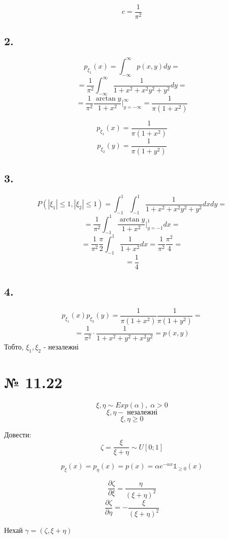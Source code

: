 \documentclass[11pt, a4paper]{article} %
\begin{document}
\begin{mdframed}[style=ans]
    $$c = \frac{1}{\pi^2}$$
\end{mdframed}

\subsection*{2.}
$$p_{\xi_1}(x) = \int_{-\infty}^\infty p(x,y) dy = $$
$$= \frac{1}{\pi^2} \int_{-\infty}^\infty \frac{1}{1+x^2+x^2y^2+y^2} dy = $$
$$= \frac{1}{\pi^2} \frac{\arctan y}{1 + x^2} |_{y = -\infty}^\infty = \frac{1}{\pi(1+x^2)}$$

$$p_{\xi_1}(x) = \frac{1}{\pi(1+x^2)}$$
$$p_{\xi_2}(y) = \frac{1}{\pi(1+y^2)}$$

\subsection*{3.}
$$P(|\xi_1|\le 1, |\xi_2| \le 1) = \int_{-1}^{1} \int_{-1}^1 \frac{1}{1+x^2+x^2y^2+y^2} dxdy = $$
$$ = \frac{1}{\pi^2} \int_{-1}^{1} \frac{\arctan y}{1 + x^2} |_{y=-1}^1 dx = $$ 
$$ = \frac{1}{\pi^2} \frac{\pi}{2} \int_{-1}^{1} \frac{1}{1 + x^2} dx = \frac{1}{\pi^2} \frac{\pi^2}{4} = $$
$$ = \frac{1}{4}$$

\subsection*{4.}
$$p_{\xi_1}(x)p_{\xi_2}(y) = \frac{1}{\pi(1+x^2)}\frac{1}{\pi(1+y^2)} = $$
$$= \frac{1}{\pi^2} \cdot \frac{1}{1 + x^2 + y^2 + x^2y^2} = p(x,y)$$
Тобто, $\xi_1, \xi_2$ - незалежні \qedsymbol

\section*{№ 11.22}
\begin{mdframed}
    $$\xi,\eta \sim Exp(\alpha), \; \alpha >0$$
    $$\xi, \eta - \;\text{незалежні}$$
    $$\boxed{\xi, \eta \ge 0}$$

    Довести:
    $$\zeta = \frac{\xi}{\xi+\eta} \sim U[0;1]$$
\end{mdframed}

$$p_\xi(x) = p_\eta(x) = p(x) = \alpha e^{-\alpha x} \mathbb{1}_{\ge 0}(x)$$

$$\frac{\partial \zeta}{\partial \xi} = \frac{\eta}{(\xi+\eta)^2}$$
$$\frac{\partial \zeta}{\partial \eta} = -\frac{\xi}{(\xi+\eta)^2}$$

Нехай $\gamma = (\zeta, \xi+\eta)$
\end{document}

